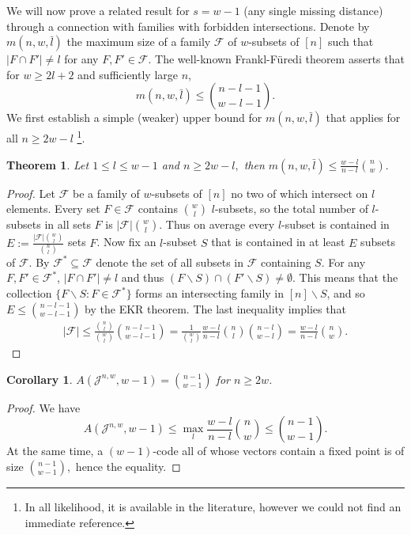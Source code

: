\documentclass{amsart}
\newtheorem{theoremenv}[definitionenv]{Theorem}
\newtheorem{corollaryenv}[definitionenv]{Corollary}
\newenvironment{theorem}{\begin{theoremenv}\rm}{\end{theoremenv}}
\newenvironment{corollary}{\begin{corollaryenv}\rm}{\end{corollaryenv}}
\newcommand{\cF}{\mathcal{F}}
\newcommand{\cJ}{\mathcal{J}}
\begin{document}
We will now prove a related result for $s=w-1$ (any single missing distance) through a connection with families with forbidden intersections. Denote by $m(n,w,\bar l)$ the maximum size of a family $\cF$ of $w$-subsets of $[n]$ such that $|F\cap F'|\ne l$ for
any $F,F'\in \cF$.
The well-known Frankl-F{\"u}redi theorem \cite{FF85} asserts that for $w\ge 2l+2$ and sufficiently large $n$,
   $$
   m(n,w,\bar l)\le \binom{n-l-1}{w-l-1}.
   $$
We first establish a simple (weaker) upper bound for $m(n,w,\bar l)$  that applies for all $n\ge 2w-l$ \footnote{In all likelihood, it is available in the literature, however we could not find an immediate reference.}.
\begin{theorem}\label{thm:wl}
Let $1\le l\le w-1$ and $n\ge 2w-l,$ then $m(n,w,\bar l)\le \frac{w-l}{n-l}\binom nw.$
\end{theorem}
\begin{proof}
Let $\cF$ be a family of $w$-subsets of $[n]$ no two of which intersect on $l$ elements. Every set $F\in \cF$ contains $\binom wl$
$l$-subsets, so the total number of $l$-subsets in all sets $F$ is $|\cF|\binom wl.$ Thus on average every $l$-subset is contained 
in $E:=\frac{|\cF|\binom wl}{\binom nl}$ sets $F$. Now fix an $l$-subset $S$ that is contained in at least $E$ subsets of $\cF$. By $\cF^*\subseteq \cF$ denote the set of all subsets in $\cF$ containing $S$. For any $F,F'\in \cF^*$, $|F\cap F'|\ne l$ and thus
$(F\backslash S)\cap (F'\backslash S)\ne \emptyset.$ This means that the collection
$\{F\backslash S:F\in \cF^*\}$ forms an intersecting family in $[n]\backslash S$, and so 
 $E\le \binom{n-l-1}{w-l-1}$ by the EKR theorem. The last inequality implies that
  \begin{gather*}
  |\cF|\le\frac{\binom nl}{\binom wl}\binom{n-l-1}{w-l-1}=\frac1{\binom wl}\frac{w-l}{n-l}\binom nl\binom{n-l}{w-l}
  =\frac{w-l}{n-l}\binom nw. 
    \end{gather*}
\end{proof}

\begin{corollary}\label{cor:ww-1}
$A(\cJ^{n,w}, w-1) = \binom{n-1}{w-1}$ for $n \geq 2w$.
\end{corollary}
\begin{proof} We have 
$$
A(\cJ^{n,w}, w-1)\le \max_l \frac{w-l}{n-l}\binom nw\le \binom{n-1}{w-1}.
$$
At the same time, a $(w-1)$-code all of whose vectors contain a fixed point is of size $\binom{n-1}{w-1},$ hence the equality.
\end{proof}
\end{document}
